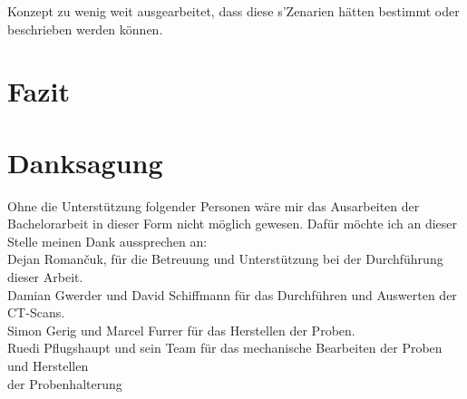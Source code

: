 Konzept zu wenig weit ausgearbeitet, dass diese s'Zenarien hätten bestimmt oder beschrieben werden können.


\newpage

\section{Fazit}


\newpage

\section{Danksagung}
Ohne die Unterstützung folgender Personen wäre mir das Ausarbeiten der Bachelorarbeit in dieser Form nicht möglich gewesen. Dafür möchte ich an dieser Stelle meinen Dank aussprechen an:\\
Dejan Roman\v{c}uk, für die Betreuung und Unterstützung bei der Durchführung dieser Arbeit.\\
Damian Gwerder und David Schiffmann für das Durchführen und Auswerten der CT-Scans.\\
Simon Gerig und Marcel Furrer für das Herstellen der Proben.\\
Ruedi Pflugshaupt und sein Team für das mechanische Bearbeiten der Proben und Herstellen\\
der Probenhalterung\\
\newpage
